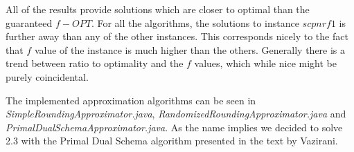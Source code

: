 All of the results provide solutions which are closer to optimal than the guaranteed $f-OPT$. For all the algorithms, the solutions to instance $scpnrf1$ is further away than any of the other instances. This corresponds nicely to the fact that $f$ value of the instance is much higher than the others. Generally there is a trend between ratio to optimality and the $f$ values, which while nice might be purely coincidental.

The implemented approximation algorithms can be seen in \textit{SimpleRoundingApproximator.java}, \textit{RandomizedRoundingApproximator.java} and \textit{PrimalDualSchemaApproximator.java}. As the name implies we decided to solve 2.3 with the Primal Dual Schema algorithm presented in the text by Vazirani.
